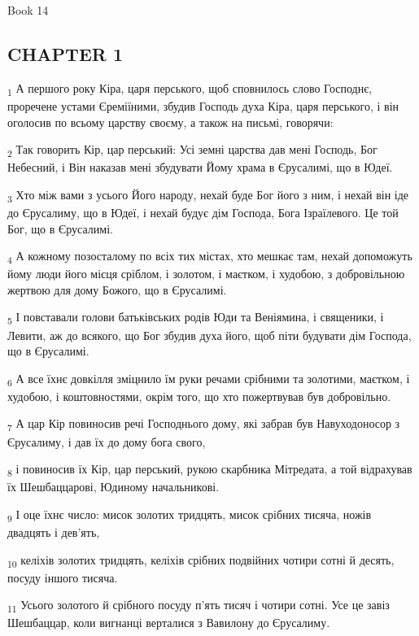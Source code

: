 Book 14
\subsection{CHAPTER 1}
\begin{tcolorbox}
\textsubscript{1} А першого року Кіра, царя перського, щоб сповнилось слово Господнє, проречене устами Єреміїними, збудив Господь духа Кіра, царя перського, і він оголосив по всьому царству своєму, а також на письмі, говорячи:
\end{tcolorbox}
\begin{tcolorbox}
\textsubscript{2} Так говорить Кір, цар перський: Усі земні царства дав мені Господь, Бог Небесний, і Він наказав мені збудувати Йому храма в Єрусалимі, що в Юдеї.
\end{tcolorbox}
\begin{tcolorbox}
\textsubscript{3} Хто між вами з усього Його народу, нехай буде Бог його з ним, і нехай він іде до Єрусалиму, що в Юдеї, і нехай будує дім Господа, Бога Ізраїлевого. Це той Бог, що в Єрусалимі.
\end{tcolorbox}
\begin{tcolorbox}
\textsubscript{4} А кожному позосталому по всіх тих містах, хто мешкає там, нехай допоможуть йому люди його місця сріблом, і золотом, і маєтком, і худобою, з добровільною жертвою для дому Божого, що в Єрусалимі.
\end{tcolorbox}
\begin{tcolorbox}
\textsubscript{5} І повставали голови батьківських родів Юди та Веніямина, і священики, і Левити, аж до всякого, що Бог збудив духа його, щоб піти будувати дім Господа, що в Єрусалимі.
\end{tcolorbox}
\begin{tcolorbox}
\textsubscript{6} А все їхнє довкілля зміцнило їм руки речами срібними та золотими, маєтком, і худобою, і коштовностями, окрім того, що хто пожертвував був добровільно.
\end{tcolorbox}
\begin{tcolorbox}
\textsubscript{7} А цар Кір повиносив речі Господнього дому, які забрав був Навуходоносор з Єрусалиму, і дав їх до дому бога свого,
\end{tcolorbox}
\begin{tcolorbox}
\textsubscript{8} і повиносив їх Кір, цар перський, рукою скарбника Мітредата, а той відрахував їх Шешбаццарові, Юдиному начальникові.
\end{tcolorbox}
\begin{tcolorbox}
\textsubscript{9} І оце їхнє число: мисок золотих тридцять, мисок срібних тисяча, ножів двадцять і дев'ять,
\end{tcolorbox}
\begin{tcolorbox}
\textsubscript{10} келіхів золотих тридцять, келіхів срібних подвійних чотири сотні й десять, посуду іншого тисяча.
\end{tcolorbox}
\begin{tcolorbox}
\textsubscript{11} Усього золотого й срібного посуду п'ять тисяч і чотири сотні. Усе це завіз Шешбаццар, коли вигнанці верталися з Вавилону до Єрусалиму.
\end{tcolorbox}
